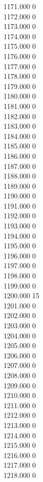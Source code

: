 { 1171.000	0 \\
 1172.000	0 \\
 1173.000	0 \\
 1174.000	0 \\
 1175.000	0 \\
 1176.000	0 \\
 1177.000	0 \\
 1178.000	0 \\
 1179.000	0 \\
 1180.000	0 \\
 1181.000	0 \\
 1182.000	0 \\
 1183.000	0 \\
 1184.000	0 \\
 1185.000	0 \\
 1186.000	0 \\
 1187.000	0 \\
 1188.000	0 \\
 1189.000	0 \\
 1190.000	0 \\
 1191.000	0 \\
 1192.000	0 \\
 1193.000	0 \\
 1194.000	0 \\
 1195.000	0 \\
 1196.000	0 \\
 1197.000	0 \\
 1198.000	0 \\
 1199.000	0 \\
 1200.000	15 \\
 1201.000	0 \\
 1202.000	0 \\
 1203.000	0 \\
 1204.000	0 \\
 1205.000	0 \\
 1206.000	0 \\
 1207.000	0 \\
 1208.000	0 \\
 1209.000	0 \\
 1210.000	0 \\
 1211.000	0 \\
 1212.000	0 \\
 1213.000	0 \\
 1214.000	0 \\
 1215.000	0 \\
 1216.000	0 \\
 1217.000	0 \\
 1218.000	0 \\
}
